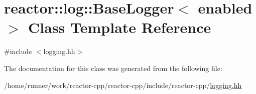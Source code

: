 \hypertarget{classreactor_1_1log_1_1BaseLogger}{}\section{reactor\+:\+:log\+:\+:Base\+Logger$<$ enabled $>$ Class Template Reference}
\label{classreactor_1_1log_1_1BaseLogger}


{\ttfamily \#include $<$logging.\+hh$>$}



The documentation for this class was generated from the following file\+:\begin{DoxyCompactItemize}
\item 
/home/runner/work/reactor-\/cpp/reactor-\/cpp/include/reactor-\/cpp/\hyperlink{logging_8hh}{logging.\+hh}\end{DoxyCompactItemize}
